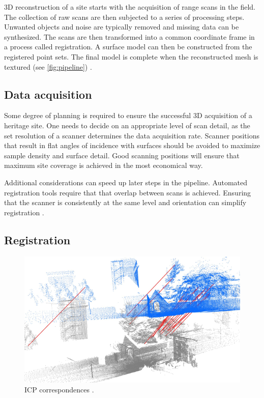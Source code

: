 3D reconstruction of a site starts with the acquisition of range scans in the field. The collection of raw scans are then subjected to a series of processing steps. Unwanted objects and noise are typically removed and missing data can be synthesized. The scans are then transformed into a common coordinate frame in a process called registration. A surface model can then be constructed from the registered point sets. The final model is complete when the reconstructed mesh is textured (see \autoref{fig:pipeline}) \cite{Ruther2011}.

\subsection{Data acquisition}
Some degree of planning is required to ensure the successful 3D acquisition of a heritage site. One needs to decide on an appropriate level of scan detail, as the set resolution of a scanner determines the data acquisition rate. Scanner positions that result in flat angles of incidence with surfaces should be avoided to maximize sample density and surface detail. Good scanning positions will ensure that maximum site coverage is achieved in the most economical way.

Additional considerations can speed up later steps in the pipeline. Automated registration tools require that that overlap between scans is achieved. Ensuring that the scanner is consistently at the same level and orientation can simplify registration \cite{Ruther2011}.

\subsection{Registration}  \label{sec:registration}

\begin{figure}[ht]
  \centreing
  \includegraphics[width=0.6\linewidth]{images/registration}
  \caption{ICP correspondences \protect\footnotemark.}
  \label{fig:registration}
\end{figure}

